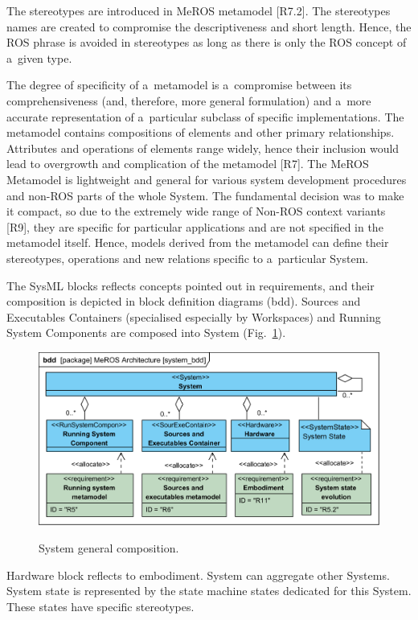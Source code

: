 \documentclass[11pt,oneside,a4paper]{report}
\begin{document}
	The stereotypes are introduced in MeROS metamodel [R7.2].
	The stereotypes names are created to compromise the descriptiveness and short length. Hence, the ROS phrase is avoided in stereotypes as long as there is only the ROS concept of a~given type.
	
	The degree of specificity of a~metamodel is a~compromise between its comprehensiveness (and, therefore, more general formulation) and a~more accurate representation of a~particular subclass of specific implementations. The metamodel contains compositions of elements and other primary relationships. Attributes and operations of elements range widely, hence their inclusion would lead to overgrowth and complication of the metamodel [R7]. The MeROS Metamodel is lightweight and general for various system development procedures and non-ROS parts of the whole System. The fundamental decision was to make it compact, so due to the extremely wide range of Non-ROS context variants [R9], they are specific for particular applications and are not specified in the metamodel itself. Hence, models derived from the metamodel can define their stereotypes, operations and new relations specific to a~particular System. 
	
	The SysML blocks reflects concepts pointed out in requirements, and their composition is depicted in block definition diagrams (bdd). Sources and Executables Containers (specialised especially by Workspaces) and Running System Components are composed into System (Fig.~\ref{fig:ros_system_bdd}).
	
		
	\begin{figure}[H]
		\centering
		\begin{center}
			{\includegraphics[scale=.92]{diagrams/system_bdd.png}}
		\end{center}
		\caption{System general composition.} 
		\label{fig:ros_system_bdd}
	\end{figure}
    Hardware block reflects to embodiment. System can aggregate other Systems. System state is represented by the state machine states dedicated for this System. These states have specific stereotypes.
	
\end{document}
